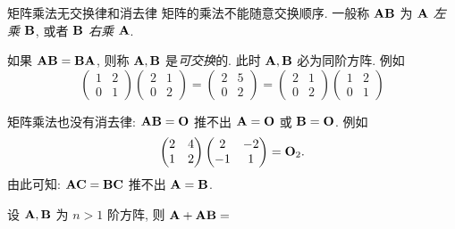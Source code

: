\begin{frame}{矩阵乘法无交换律和消去律}
	\onslide<+->
	\alert{矩阵的乘法不能随意交换顺序}.
	\onslide<+->
	一般称 ${\mathbf{A}}{\mathbf{B}}$ 为 \emph{${\mathbf{A}}$ 左乘 ${\mathbf{B}}$}, 或者 \emph{${\mathbf{B}}$ 右乘 ${\mathbf{A}}$}.

	\onslide<+->
	如果 ${\mathbf{A}}{\mathbf{B}}={\mathbf{B}}{\mathbf{A}}$, 则称 ${\mathbf{A}},{\mathbf{B}}$ 是\emph{可交换}的.
	\onslide<+->
	此时 ${\mathbf{A}},{\mathbf{B}}$ \alert{必为同阶方阵}.
	\onslide<+->
	例如
	\[\begin{pmatrix}
		1&2\\0&1
	\end{pmatrix}\begin{pmatrix}
		2&1\\0&2
	\end{pmatrix}=\begin{pmatrix}
		2&5\\0&2
	\end{pmatrix}=\begin{pmatrix}
		2&1\\0&2
	\end{pmatrix}\begin{pmatrix}
		1&2\\0&1
	\end{pmatrix}\]

	\onslide<+->
	矩阵乘法也没有消去律: ${\mathbf{A}}{\mathbf{B}}={\mathbf{O}}$ 推不出 ${\mathbf{A}}={\mathbf{O}}$ 或 ${\mathbf{B}}={\mathbf{O}}$.
	\onslide<+->
	例如
	\[\begin{pmatrix}
		2&4\\1&2
	\end{pmatrix}\begin{pmatrix}
		2&-2\\-1&1
	\end{pmatrix}={\mathbf{O}}_2.\]
	\onslide<+->
	由此可知: ${\mathbf{A}}{\mathbf{C}}={\mathbf{B}}{\mathbf{C}}$ 推不出 ${\mathbf{A}}={\mathbf{B}}$. 

	\onslide<+->
	\begin{exercise}
		设 ${\mathbf{A}},{\mathbf{B}}$ 为 $n>1$ 阶方阵, 则 ${\mathbf{A}}+{\mathbf{A}}{\mathbf{B}}=$
	\end{exercise}
\end{frame}


